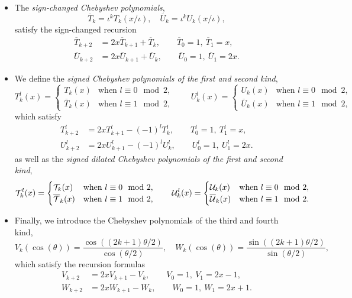 \documentclass[a4paper,fleqn]{cas-sc}
\def\widebar#1{{\overline{#1}}}
\begin{document}
\begin{itemize}
The proof of  is similar to the proof of .
\item The {\em sign-changed Chebyshev polynomials},
\begin{equation} \label{eq:rsct}
\widebar{T}_k=\iota^k{T}_k\left(x/\iota\right),\quad
\widebar{U}_k=\iota^k{U}_k\left(x/\iota\right),
\end{equation}
satisfy the sign-changed recursion
\begin{align*}
\widebar{T}_{k+2}&=2x\widebar{T}_{k+1}+\widebar{T}_k,\qquad \widebar{T}_0=1,\ \widebar{T}_1=x,\\
\widebar{U}_{k+2}&=2x\widebar{U}_{k+1}+\widebar{U}_k,\qquad \widebar{U}_0=1,\ \widebar{U}_1=2x.
\end{align*}
\item We define the {\em signed Chebyshev polynomials of the first and second kind},
\[
T_k^l(x)=\begin{cases}
T_k(x) & \text{when } l \equiv 0 \mod 2,\\
\widebar{T}_k(x) &\text{when } l \equiv 1 \mod 2,
\end{cases}\qquad
U_k^l(x)=\begin{cases}
U_k(x) &\text{when } l \equiv 0 \mod 2,\\
\widebar{U}_k(x) &\text{when } l \equiv 1 \mod 2,
\end{cases}
\]
which satisfy
\begin{align}
T^l_{k+2}&=2xT^l_{k+1}-(-1)^lT^l_k,\qquad T^l_0=1,\ T^l_1=x,\label{eq:Tl}\\
U^l_{k+2}&=2xU^l_{k+1}-(-1)^lU^l_k,\qquad U^l_0=1,\ U^l_1=2x.\label{eq:Ul}
\end{align}
as well as the {\em signed dilated Chebyshev polynomials of the first and second kind},
\[
{\cal T}_k^l(x)=\begin{cases}
{\cal T}_k(x) &\text{when } l \equiv 0 \mod 2,\\
\widebar{{\cal T}}_k(x) &\text{when } l \equiv 1 \mod 2,
\end{cases}\qquad
{\cal U}^l_k(x)=\begin{cases}
{\cal U}_k(x) &\text{when } l \equiv 0 \mod 2,\\
\widebar{{\cal U}}_k(x) &\text{when } l \equiv 1 \mod 2.
\end{cases}
\]
\item Finally, we introduce the Chebyshev polynomials of the third and fourth kind,
\begin{equation} \label{eq:dfw}
V_k(\cos(\theta))=\frac{\cos((2k+1)\theta/2)}{\cos(\theta/2)},\quad
W_k(\cos(\theta))=\frac{\sin((2k+1)\theta/2)}{\sin(\theta/2)},
\end{equation}     
which satisfy the recursion formulas
\begin{align*}
V_{k+2}&=2xV_{k+1}-V_k,\qquad V_0=1,\ V_1=2x-1,\\
W_{k+2}&=2xW_{k+1}-W_k,\qquad W_0=1,\ W_1=2x+1.
\end{align*}
\end{itemize}
\end{document}
